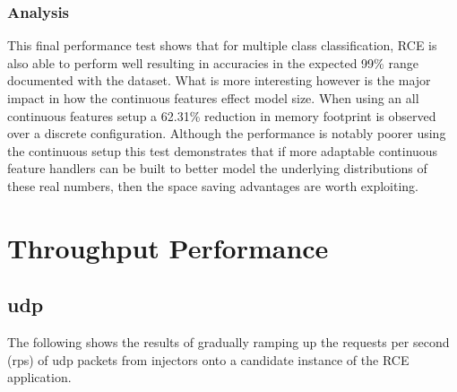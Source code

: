 \documentclass[a4paper,11pt]{scrreprt}
\begin{document}
\subsubsection{Analysis}
This final performance test shows that for multiple class classification, RCE is also able to perform well resulting in accuracies in the expected 99\% range documented with the dataset. What is more interesting however is the major impact in how the continuous features effect model size. When using an all continuous features setup a 62.31\% reduction in memory footprint is observed over a discrete configuration. Although the performance is notably poorer using the continuous setup this test demonstrates that if more adaptable continuous feature handlers can be built to better model the underlying distributions of these real numbers, then the space saving advantages are worth exploiting. 
\clearpage

\section{Throughput Performance}
\subsection{\acrshort{udp}}
The following shows the results of gradually ramping up the requests per second (\acrshort{rps}) of \acrshort{udp} packets from injectors onto a candidate instance of the RCE application.
\end{document}
